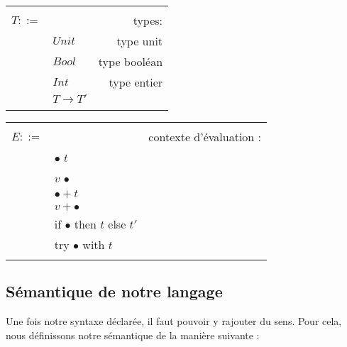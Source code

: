 \documentclass[11pt, a4paper, notitlepage]{article}
\newcommand\tab{{\hspace*{12.5mm}}}
\begin{document}
\begin{center}
   \begin{tabular}{|llr|}
      \hline
      & &\\
      $T ::=$ & & types:\\
      & $Unit$ & type unit\\
      & $Bool$ & type booléan\\
      & $Int$ & type entier\\
      & $T \to T'$ &\\
      & &\\
      \hline
   \end{tabular}
   \begin{tabular}{|llr|}
      \hline
      & &\\
      $E ::=$ & & contexte d'évaluation :\\
      & $\bullet$ $t$ &\\
      & $v$ $\bullet$ &\\
      & $\bullet + t$ &\\
      & $v + \bullet$ &\\
      & if $\bullet$ then $t$ else $t'$ &\\
      & try $\bullet$ with $t$ &\\
      & &\\
      \hline
\end{tabular}
\end{center}

\subsection{Sémantique de notre langage}
\tab Une fois notre syntaxe déclarée, il faut pouvoir y rajouter du sens. Pour cela, nous définissons notre sémantique de la manière suivante :
\end{document}
